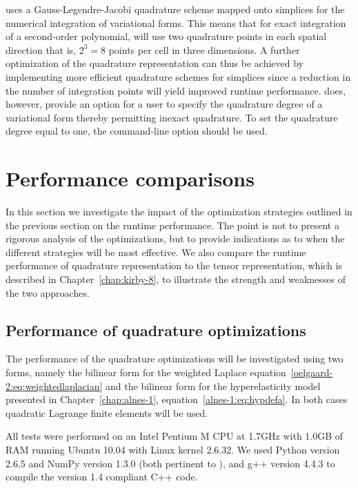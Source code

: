 \ffc{} uses a Gauss-Legendre-Jacobi quadrature scheme mapped onto
simplices for the numerical integration of variational forms.  This
means that for exact integration of a second-order polynomial, \ffc{}
will use two quadrature points in each spatial direction that is, $2^3
= 8$ points per cell in three dimensions.  A further optimization of
the quadrature representation can thus be achieved by implementing
more efficient quadrature schemes for simplices since a reduction in
the number of integration points will yield improved runtime
performance.  \ffc{} does, however, provide an option for a user to
specify the quadrature degree of a variational form thereby permitting
inexact quadrature.  To set the quadrature degree equal to one, the
command-line option  should be used.

\section{Performance comparisons}

In this section we investigate the impact of the optimization
strategies outlined in the previous section on the runtime
performance. The point is not to present a rigorous analysis of the
optimizations, but to provide indications as to when the different
strategies will be most effective.  We also compare the runtime
performance of quadrature representation to the tensor representation,
which is described in Chapter~\ref{chap:kirby-8}, to illustrate the
strength and weaknesses of the two approaches.

\subsection{Performance of quadrature optimizations}
\label{oelgaard-2:sec:quad_performance}

The performance of the quadrature optimizations will be investigated
using two forms, namely the bilinear form for the weighted Laplace
equation~\eqref{oelgaard-2:eq:weightedlaplacian} and the bilinear form
for the hyperelasticity model presented in Chapter~\ref{chap:alnes-1},
equation~\eqref{alnes-1:eq:hypdefa}.  In both cases quadratic Lagrange
finite elements will be used.

All tests were performed on an Intel Pentium M CPU at 1.7GHz with
1.0GB of RAM running Ubuntu 10.04 with Linux kernel 2.6.32.  We used
Python version 2.6.5 and NumPy version 1.3.0 (both pertinent to
\ffc{}), and g++ version 4.4.3 to compile the \ufc{} version 1.4
compliant C++ code.

